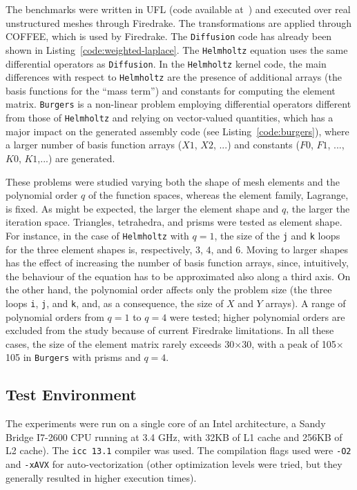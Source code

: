 The benchmarks were written in UFL (code available at~\citep{ufl-code-lowlevelopt}) and executed over real unstructured meshes through Firedrake. The transformations are applied through COFFEE, which is used by Firedrake. The {\tt Diffusion} code has already been shown in Listing~\ref{code:weighted-laplace}. The {\tt Helmholtz} equation uses the same differential operators as {\tt Diffusion}. In the {\tt Helmholtz} kernel code, the main differences with respect to {\tt Helmholtz} are the presence of additional arrays (the basis functions for the ``mass term'') and constants for computing the element matrix. {\tt Burgers} is a non-linear problem employing differential operators different from those of {\tt Helmholtz} and relying on vector-valued quantities, which has a major impact on the generated assembly code (see Listing~\ref{code:burgers}), where a larger number of basis function arrays ($X1$, $X2$, ...) and constants ($F0$, $F1$, ..., $K0$, $K1$,...) are generated.

These problems were studied varying both the shape of mesh elements and the polynomial order $q$ of the function spaces, whereas the element family, Lagrange, is fixed. As might be expected, the larger the element shape and $q$, the larger the iteration space. Triangles, tetrahedra, and prisms were tested as element shape. For instance, in the case of {\tt Helmholtz} with $q=1$, the size of the \texttt{j} and \texttt{k} loops for the three element shapes is, respectively, $3$, $4$, and $6$. Moving to larger shapes has the effect of increasing the number of basis function arrays, since, intuitively, the behaviour of the equation has to be approximated also along a third axis. On the other hand, the polynomial order affects only the problem size (the three loops \texttt{i}, \texttt{j}, and \texttt{k}, and, as a consequence, the size of $X$ and $Y$ arrays). A range of polynomial orders from $q=1$ to $q=4$ were tested; higher polynomial orders are excluded from the study because of current Firedrake limitations. In all these cases, the size of the element matrix rarely exceeds 30$\times$30, with a peak of 105$\times$105 in {\tt Burgers} with prisms and $q=4$.

\subsection{Test Environment}
The experiments were run on a single core of an Intel architecture, a Sandy Bridge I7-2600 CPU running at 3.4 GHz, with 32KB of L1 cache and 256KB of L2 cache). The \texttt{icc 13.1} compiler was used. The compilation flags used were \texttt{-O2} and \texttt{-xAVX} for auto-vectorization (other optimization levels were tried, but they generally resulted in higher execution times). 

